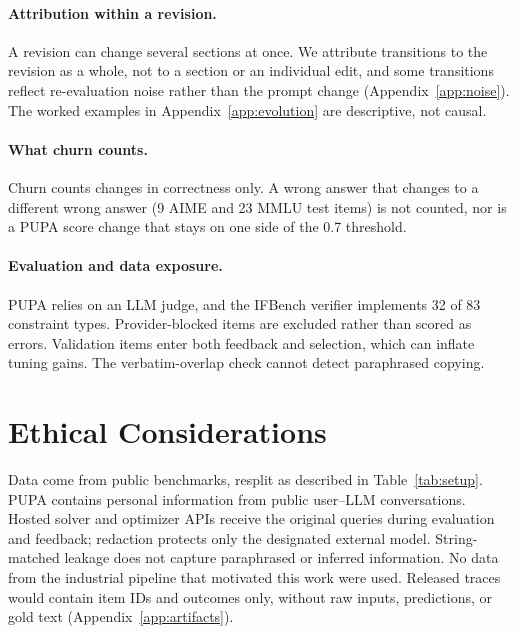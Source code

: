 \documentclass[11pt]{article}
\begin{document}
\paragraph{Attribution within a revision.}
A revision can change several sections at once. We attribute transitions to the revision as a whole, not to a section or an individual edit, and some transitions reflect re-evaluation noise rather than the prompt change (Appendix~\ref{app:noise}). The worked examples in Appendix~\ref{app:evolution} are descriptive, not causal.

\paragraph{What churn counts.}
Churn counts changes in correctness only. A wrong answer that changes to a different wrong answer (9 AIME and 23 MMLU test items) is not counted, nor is a PUPA score change that stays on one side of the 0.7 threshold.

\paragraph{Evaluation and data exposure.}
PUPA relies on an LLM judge, and the IFBench verifier implements 32 of 83 constraint types. Provider-blocked items are excluded rather than scored as errors. Validation items enter both feedback and selection, which can inflate tuning gains. The verbatim-overlap check cannot detect paraphrased copying.


\section*{Ethical Considerations}
Data come from public benchmarks, resplit as described in Table~\ref{tab:setup}. PUPA contains personal information from
public user--LLM conversations. Hosted solver and optimizer APIs receive the original queries during evaluation and
feedback; redaction protects only the designated external model. String-matched leakage does not capture paraphrased or
inferred information. No data from the industrial pipeline that motivated this work were used. Released traces would
contain item IDs and outcomes only, without raw inputs, predictions, or gold text (Appendix~\ref{app:artifacts}).

\FloatBarrier


\appendix
\end{document}
